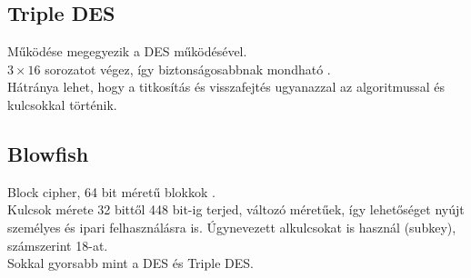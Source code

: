\subsection{Triple DES}
\noindent Működése megegyezik a DES működésével.
\vspace{5pt}\\$3 \times 16$ sorozatot végez, így biztonságosabbnak mondható \cite{enwiki:1078804116}.
\vspace{5pt}\\Hátránya lehet, hogy a titkosítás és visszafejtés ugyanazzal az algoritmussal és kulcsokkal történik.



\subsection{Blowfish}
\noindent Block cipher, 64 bit méretű blokkok \cite{nie2009study}.
\vspace{5pt}\\ Kulcsok mérete 32 bittől 448 bit-ig terjed, változó méretűek, így lehetőséget nyújt személyes és ipari felhasználásra is. Úgynevezett alkulcsokat is használ (subkey), számszerint 18-at.
\vspace{5pt}\\ Sokkal gyorsabb mint a DES és Triple DES.









